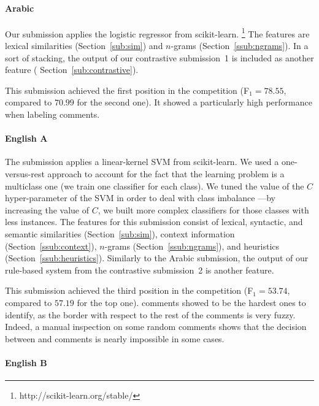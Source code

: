 \paragraph{Arabic} 
Our submission applies the logistic regressor from scikit-learn.%
\footnote{http://scikit-learn.org/stable/}
The features are lexical similarities (Section~\ref{sub:sim}) and  $n$-grams 
(Section~\ref{ssub:ngrams}). In a sort of stacking, the output of our 
contrastive submission~1 is included as another feature (\cf 
Section~\ref{sub:contrastive}). 

This submission achieved the first position in the competition (F$_1=78.55$, 
compared to $70.99$ for the second one). It showed a particularly high 
performance when labeling \rel comments.

\paragraph{English A}
The submission applies a linear-kernel SVM from scikit-learn. We used a 
one-versus-rest approach to account for the fact that the learning problem is a 
multiclass one (\ie we train one classifier for each class). We tuned the value of the $C$ hyper-parameter of the SVM in 
order to deal with class imbalance ---by increasing the value of $C$, we built 
more complex classifiers for those classes with less instances. The features for 
this submission consist of lexical, syntactic, and semantic similarities 
(Section~\ref{sub:sim}), context information (Section~\ref{ssub:context}), 
$n$-grams (Section~\ref{ssub:ngrams}), and heuristics 
(Section~\ref{ssub:heuristics}). Similarly to the Arabic submission, the output 
of our rule-based system from the contrastive submission~2 is another feature. 

This submission achieved the third position in the competition (F$_1=53.74$, 
compared to $57.19$ for the top one). \pot comments showed to be the 
hardest ones to identify, as the border with respect to the rest of the comments 
is very fuzzy. Indeed, a manual inspection on some random comments shows that the 
decision between \good and \pot comments is nearly impossible in some cases.

\paragraph{English B}

